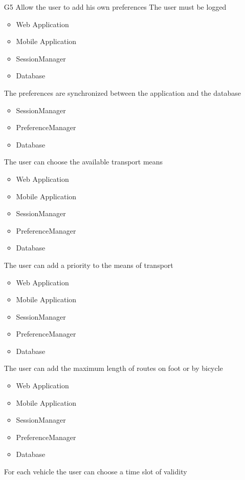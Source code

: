 \begin{itemize}
 	\item[G5] Allow the user to add his own preferences
 	\subitem[G5.1] The user must be logged
 	\begin{itemize}[leftmargin=1in]
 		\item Web Application
 		\item Mobile Application
 		\item SessionManager
 		\item Database
 	\end{itemize}
 	\subitem[G5.2] The preferences are synchronized between the application and the database
 	\begin{itemize}[leftmargin=1in]
 		\item SessionManager
 		\item PreferenceManager
 		\item Database
 	\end{itemize}
 	\subitem[G5.3] The user can choose the available transport means
 	\begin{itemize}[leftmargin=1in]
 		\item Web Application
 		\item Mobile Application
 		\item SessionManager
 		\item PreferenceManager
 		\item Database
 	\end{itemize}
 	\subitem[G5.4] The user can add a priority to the means of transport
 	\begin{itemize}[leftmargin=1in]
 		\item Web Application
 		\item Mobile Application
 		\item SessionManager
 		\item PreferenceManager
 		\item Database
 	\end{itemize}
 	\subitem[G5.5] The user can add the maximum length of routes on foot or by bicycle
 	\begin{itemize}[leftmargin=1in]
 		\item Web Application
 		\item Mobile Application
 		\item SessionManager
 		\item PreferenceManager
 		\item Database
 	\end{itemize}
 	\subitem[G5.6] For each vehicle the user can choose a time slot of validity
 	\begin{itemize}[leftmargin=1in]

\end{itemize}
\end{itemize}

